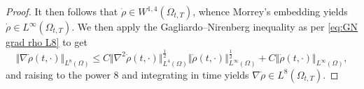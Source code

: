 \documentclass[11pt,a4paper,reqno]{amsart}
\theoremstyle{remark}
\theoremstyle{definition}
\numberwithin{equation}{section}
\begin{document}
\begin{proof}
It then follows that $\dot{\rho} \in W^{1,4}(\Omega_{t,T})$, whence Morrey's embedding yields $\dot{\rho} \in L^\infty(\Omega_{t,T})$. We then apply the Gagliardo--Nirenberg inequality as per \eqref{eq:GN grad rho L8} to get 
\begin{equation}\label{eq:GN grad rho dot L8}
    \Vert \nabla\dot{\rho}(t,\cdot) \Vert_{L^8(\Omega)} \leq C \Vert   \nabla^2\dot{\rho}(t,\cdot) \Vert_{L^4(\Omega)}^{\frac{1}{2}} \Vert \dot{\rho}(t,\cdot) \Vert_{L^\infty(\Omega)}^{\frac{1}{2}} + C \Vert \dot{\rho}(t,\cdot) \Vert_{L^\infty(\Omega)}, 
\end{equation}
and raising to the power $8$ and integrating in time yields $\nabla \dot{\rho} \in L^8(\Omega_{t,T})$.
\end{proof}
\end{document}
